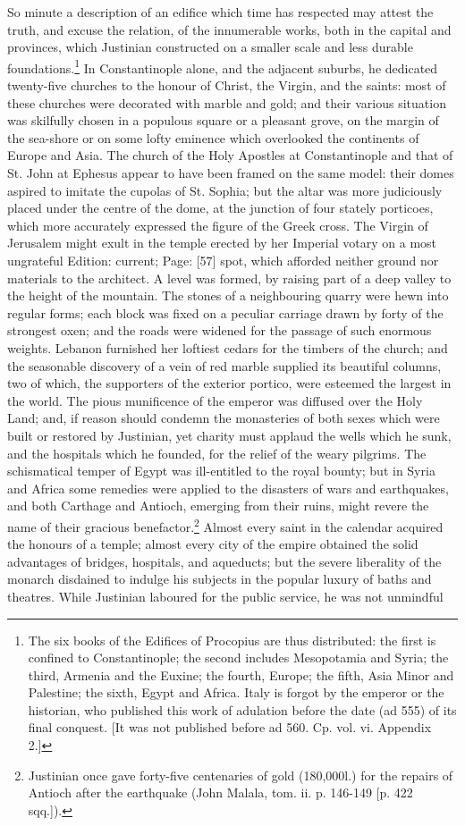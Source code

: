 So minute a description of an edifice which time has respected may attest the truth, and excuse the relation, of the innumerable works, both in the capital and provinces, which Justinian constructed on a smaller scale and less durable foundations.\footnote{The six books of the Edifices of Procopius are thus distributed: the first is confined to Constantinople; the second includes Mesopotamia and Syria; the third, Armenia and the Euxine; the fourth, Europe; the fifth, Asia Minor and Palestine; the sixth, Egypt and Africa. Italy is forgot by the emperor or the historian, who published this work of adulation before the date (ad 555) of its final conquest. [It was not published before ad 560. Cp. vol. vi. Appendix 2.]} In Constantinople alone, and the adjacent suburbs, he dedicated twenty-five churches to the honour of Christ, the Virgin, and the saints: most of these churches were decorated with marble and gold; and their various situation was skilfully chosen in a populous square or a pleasant grove, on the margin of the sea-shore or on some lofty eminence which overlooked the continents of Europe and Asia. The church of the Holy Apostles at Constantinople and that of St. John at Ephesus appear to have been framed on the same model: their domes aspired to imitate the cupolas of St. Sophia; but the altar was more judiciously placed under the centre of the dome, at the junction of four stately porticoes, which more accurately expressed the figure of the Greek cross. The Virgin of Jerusalem might exult in the temple erected by her Imperial votary on a most ungrateful Edition: current; Page: [57] spot, which afforded neither ground nor materials to the architect. A level was formed, by raising part of a deep valley to the height of the mountain. The stones of a neighbouring quarry were hewn into regular forms; each block was fixed on a peculiar carriage drawn by forty of the strongest oxen; and the roads were widened for the passage of such enormous weights. Lebanon furnished her loftiest cedars for the timbers of the church; and the seasonable discovery of a vein of red marble supplied its beautiful columns, two of which, the supporters of the exterior portico, were esteemed the largest in the world. The pious munificence of the emperor was diffused over the Holy Land; and, if reason should condemn the monasteries of both sexes which were built or restored by Justinian, yet charity must applaud the wells which he sunk, and the hospitals which he founded, for the relief of the weary pilgrims. The schismatical temper of Egypt was ill-entitled to the royal bounty; but in Syria and Africa some remedies were applied to the disasters of wars and earthquakes, and both Carthage and Antioch, emerging from their ruins, might revere the name of their gracious benefactor.\footnote{Justinian once gave forty-five centenaries of gold (180,000l.) for the repairs of Antioch after the earthquake (John Malala, tom. ii. p. 146-149 [p. 422 sqq.]).} Almost every saint in the calendar acquired the honours of a temple; almost every city of the empire obtained the solid advantages of bridges, hospitals, and aqueducts; but the severe liberality of the monarch disdained to indulge his subjects in the popular luxury of baths and theatres. While Justinian laboured for the public service, he was not unmindful 
